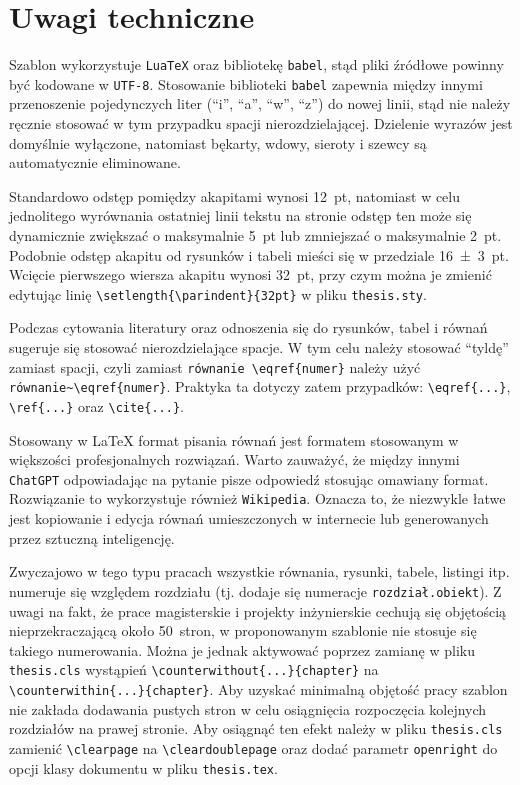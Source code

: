 \begin{listing}[ht!]
\inputminted[linenos, breaklines]{tex}{thesis.tex}
\end{listing}

\section{Uwagi techniczne}

Szablon wykorzystuje \texttt{LuaTeX} oraz bibliotekę \texttt{babel}, stąd pliki źródłowe powinny być kodowane w \texttt{UTF-8}. Stosowanie biblioteki \texttt{babel} zapewnia między innymi przenoszenie pojedynczych liter (\enquote{i}, \enquote{a}, \enquote{w}, \enquote{z}) do nowej linii, stąd nie należy ręcznie stosować w tym przypadku spacji nierozdzielającej. Dzielenie wyrazów jest domyślnie wyłączone, natomiast bękarty, wdowy, sieroty i szewcy są automatycznie eliminowane.

Standardowo odstęp pomiędzy akapitami wynosi \qty{12}{pt}, natomiast w celu jednolitego wyrównania ostatniej linii tekstu na stronie odstęp ten może się dynamicznie zwiększać o maksymalnie \qty{5}{pt} lub zmniejszać o maksymalnie \qty{2}{pt}. Podobnie odstęp akapitu od rysunków i tabeli mieści się w przedziale \qty{16 \pm 3}{pt}. Wcięcie pierwszego wiersza akapitu wynosi \qty{32}{pt}, przy czym można je zmienić edytując linię \verb|\setlength{\parindent}{32pt}| w pliku \texttt{thesis.sty}.

Podczas cytowania literatury oraz odnoszenia się do rysunków, tabel i równań sugeruje się stosować nierozdzielające spacje. W tym celu należy stosować \enquote{tyldę} zamiast spacji, czyli zamiast \verb|równanie \eqref{numer}| należy użyć \verb|równanie~\eqref{numer}|. Praktyka ta dotyczy zatem przypadków: \verb|\eqref{...}|, \verb|\ref{...}| oraz \verb|\cite{...}|.

Stosowany w \LaTeX{} format pisania równań jest formatem stosowanym w większości profesjonalnych rozwiązań. Warto zauważyć, że między innymi \texttt{ChatGPT} odpowiadając na pytanie pisze odpowiedź stosując omawiany format. Rozwiązanie to wykorzystuje również \texttt{Wikipedia}. Oznacza to, że niezwykle łatwe jest kopiowanie i edycja równań umieszczonych w internecie lub generowanych przez sztuczną inteligencję.

Zwyczajowo w tego typu pracach wszystkie równania, rysunki, tabele, listingi itp. numeruje się względem rozdziału (tj. dodaje się numeracje \texttt{rozdział.obiekt}). Z uwagi na fakt, że prace magisterskie i projekty inżynierskie cechują się objętością nieprzekraczającą około \qty{50}{stron}, w proponowanym szablonie nie stosuje się takiego numerowania. Można je jednak aktywować poprzez zamianę w pliku \texttt{thesis.cls} wystąpień \verb|\counterwithout{...}{chapter}| na \verb|\counterwithin{...}{chapter}|. Aby uzyskać minimalną objętość pracy szablon nie zakłada dodawania pustych stron w celu osiągnięcia rozpoczęcia kolejnych rozdziałów na prawej stronie. Aby osiągnąć ten efekt należy w pliku \texttt{thesis.cls} zamienić \verb|\clearpage| na \verb|\cleardoublepage| oraz dodać parametr \texttt{openright} do opcji klasy dokumentu w pliku \texttt{thesis.tex}.

